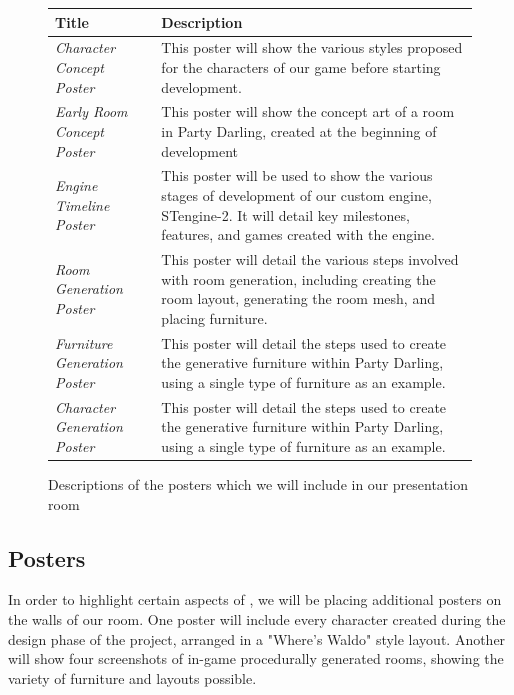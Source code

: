 \documentclass{GlobalDocument}
\begin{document}
\begin{figure}[htb]
	\centering
	\begin{tabular}{ | p{7cm} | p{7cm} |}
		\hline
		Title & Description \\ \hline
		
		\textit{Character Concept Poster}&
		This poster will show the various styles proposed for the characters of our game before starting development.\\ \hline
		
		\textit{Early Room Concept Poster}&
		This poster will show the concept art of a room in Party Darling, created at the beginning of development\\ \hline
		
		\textit{Engine Timeline Poster}&
		This poster will be used to show the various stages of development of our custom engine, STengine-2. It will detail key milestones, features, and games created with the engine.\\ \hline
		
		\textit{Room Generation Poster}&
		This poster will detail the various steps involved with room generation, including creating the room layout, generating the room mesh, and placing furniture.\\ \hline
		
		\textit{Furniture Generation Poster} &
		This poster will detail the steps used to create the generative furniture within Party Darling, using a single type of furniture as an example.\\ \hline
		
		\textit{Character Generation Poster} &
		This poster will detail the steps used to create the generative furniture within Party Darling, using a single type of furniture as an example.\\ \hline
		
	\end{tabular}
	\caption{Descriptions of the posters which we will include in our presentation room}
	\label{table:products}
\end{figure}

\subsection{\ourgame{} Posters}
In order to highlight certain aspects of \ourgame{}, we will be placing additional posters on the walls of our room. One poster will include every character created during the design phase of the project, arranged in a "Where's Waldo" style layout. Another will show four screenshots of in-game procedurally generated rooms, showing the variety of furniture and layouts possible.
\end{document}

